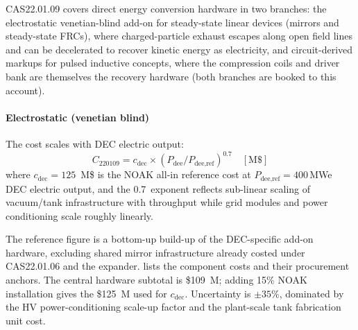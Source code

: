 \documentclass{article}
\begin{document}
CAS22.01.09 covers direct energy conversion hardware in two branches:
the electrostatic venetian-blind add-on for steady-state linear devices
(mirrors and steady-state FRCs), where charged-particle exhaust escapes
along open field lines and can be decelerated to recover kinetic energy
as electricity, and circuit-derived markups for pulsed inductive
concepts, where the compression coils and driver bank are themselves the
recovery hardware (both branches are booked to this account).

\paragraph{Electrostatic (venetian blind)}
The cost scales with DEC electric output:
\begin{equation}
  C_{220109} = c_{\text{dec}} \times (P_{\text{dee}} / P_{\text{dee,ref}})^{0.7}
  \quad [\text{M\$}]
\end{equation}
where $c_{\text{dec}} = 125$~M\$ is the NOAK all-in reference
cost at $P_{\text{dee,ref}} = 400$\,MWe DEC electric output, and the
0.7~exponent reflects sub-linear scaling of vacuum/tank infrastructure
with throughput while grid modules and power conditioning scale roughly
linearly.

The reference figure is a bottom-up build-up of the DEC-specific add-on
hardware, excluding shared mirror infrastructure already costed under
CAS22.01.06 and the expander.  lists the component
costs and their procurement anchors. The central hardware subtotal is
\$109~M; adding 15\% NOAK installation gives the \$125~M used for
$c_{\text{dec}}$. Uncertainty is $\pm 35\%$, dominated by the HV
power-conditioning scale-up factor and the plant-scale tank fabrication
unit cost.
\end{document}
